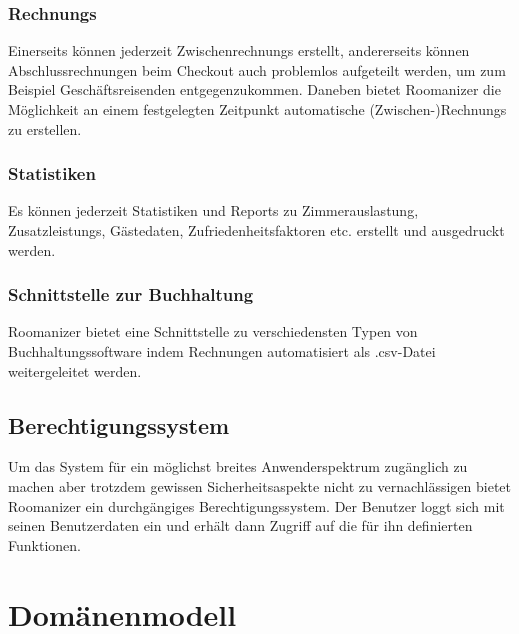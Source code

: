 \documentclass[10pt,a4paper,titlepage]{article}
\begin{document}
\subsubsection{\Glspl{Rechnung}}
Einerseits können jederzeit \Glspl{Zwischenrechnung} erstellt, andererseits können Abschlussrechnungen beim \Gls{Checkout} auch problemlos aufgeteilt werden, um zum Beispiel Geschäftsreisenden entgegenzukommen. Daneben bietet Roomanizer die Möglichkeit an einem festgelegten Zeitpunkt automatische (Zwischen-)\Glspl{Rechnung} zu erstellen. 

\subsubsection{Statistiken}
Es können jederzeit Statistiken und \Glspl{Report} zu Zimmerauslastung, \Glspl{Zusatzleistung}, Gästedaten, Zufriedenheitsfaktoren etc. erstellt und ausgedruckt werden.

\subsubsection{Schnittstelle zur Buchhaltung}
Roomanizer bietet eine Schnittstelle zu verschiedensten Typen von Buchhaltungssoftware indem Rechnungen automatisiert als .csv-Datei weitergeleitet werden.

\subsection{Berechtigungssystem}
Um das System für ein möglichst breites Anwenderspektrum zugänglich zu machen aber trotzdem gewissen Sicherheitsaspekte nicht zu vernachlässigen bietet Roomanizer ein durchgängiges Berechtigungssystem. Der Benutzer loggt sich mit seinen Benutzerdaten ein und erhält dann Zugriff auf die für ihn definierten Funktionen.

\newpage

\section{Domänenmodell}
\end{document}
